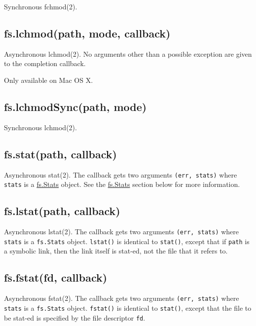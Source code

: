 Synchronous fchmod(2).

\subsection{fs.lchmod(path, mode,
callback)}\label{fs.lchmodpath-mode-callback}

Asynchronous lchmod(2). No arguments other than a possible exception are
given to the completion callback.

Only available on Mac OS X.

\subsection{fs.lchmodSync(path, mode)}\label{fs.lchmodsyncpath-mode}

Synchronous lchmod(2).

\subsection{fs.stat(path, callback)}\label{fs.statpath-callback}

Asynchronous stat(2). The callback gets two arguments
\texttt{(err, stats)} where \texttt{stats} is a
\hyperref[fsux5fclassux5ffsux5fstats]{fs.Stats} object. See the
\hyperref[fsux5fclassux5ffsux5fstats]{fs.Stats} section below for more
information.

\subsection{fs.lstat(path, callback)}\label{fs.lstatpath-callback}

Asynchronous lstat(2). The callback gets two arguments
\texttt{(err, stats)} where \texttt{stats} is a \texttt{fs.Stats}
object. \texttt{lstat()} is identical to \texttt{stat()}, except that if
\texttt{path} is a symbolic link, then the link itself is stat-ed, not
the file that it refers to.

\subsection{fs.fstat(fd, callback)}\label{fs.fstatfd-callback}

Asynchronous fstat(2). The callback gets two arguments
\texttt{(err, stats)} where \texttt{stats} is a \texttt{fs.Stats}
object. \texttt{fstat()} is identical to \texttt{stat()}, except that
the file to be stat-ed is specified by the file descriptor \texttt{fd}.

